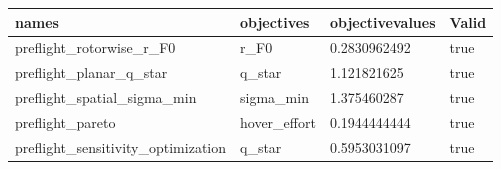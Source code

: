 \begin{tabular}{@{}llll@{}}
\toprule
names & objectives & objectivevalues & Valid \\
\midrule
preflight\_rotorwise\_r\_F0 & r\_F0 & 0.2830962492 & true \\
preflight\_planar\_q\_star & q\_star & 1.121821625 & true \\
preflight\_spatial\_sigma\_min & sigma\_min & 1.375460287 & true \\
preflight\_pareto & hover\_effort & 0.1944444444 & true \\
preflight\_sensitivity\_optimization & q\_star & 0.5953031097 & true \\
\bottomrule
\end{tabular}
